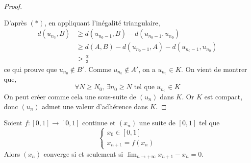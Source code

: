 \begin{proof}
\begin{center}
		\end{center}
		D'après $(*)$, en appliquant l'inégalité triangulaire,
		\begin{align*}
			d(u_{n_0}, B) & \geq d(u_{n_0 - 1}, B) - d(u_{n_0 - 1}, u_{n_0})           \\
			& \geq d(A, B) - d(u_{n_0 - 1}, A) - d(u_{n_0 - 1}, u_{n_0}) \\
			& > \frac{\alpha}{3}
		\end{align*}
		ce qui prouve que $u_{n_0} \notin B'$. Comme $u_{n_0} \notin A'$, on a $u_{n_0} \in K$. On vient de montrer que,
		\[ \forall N \geq N_0, \, \exists n_0 \geq N \text{ tel que } u_{n_0} \in K \]
		On peut créer comme cela une sous-suite de $(u_n)$ dans $K$. Or $K$ est compact, donc $(u_n)$ admet une valeur d'adhérence dans $K$.
	\end{proof}


	\begin{application}
		Soient $f : [0, 1] \rightarrow [0, 1]$ continue et $(x_n)$ une suite de $[0, 1]$ tel que
		\[ \begin{cases} x_0 \in [0, 1] \\ x_{n+1} = f(x_n) \end{cases} \]
		Alors $(x_n)$ converge si et seulement si $\lim_{n \rightarrow +\infty } x_{n+1} - x_n = 0$.
	\end{application}

